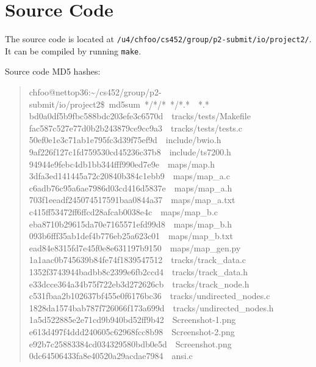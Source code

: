\documentclass[letterpaper]{article}
\begin{document}
\section{Source Code%
  \label{source-code}%
}

The source code is located at \texttt{/u4/chfoo/cs452/group/p2-submit/io/project2/}. It can be compiled by running \texttt{make}.

Source code MD5 hashes:
%
\begin{quote}{\ttfamily \raggedright \noindent
chfoo@nettop36:\textasciitilde{}/cs452/group/p2-submit/io/project2\$~md5sum~*/*/*~*/*.*~~*.*\\
bd0a0df5b9fbc588bdc203efe3c6570d~~tracks/tests/Makefile\\
fac587c527e77d0b2b243879ce9cc9a3~~tracks/tests/tests.c\\
50ef0e1e3c71ab1e795fc3d39f75ef9d~~include/bwio.h\\
9af226f127c1fd759530cd45236c37b8~~include/ts7200.h\\
94944e9febc4db1bb344fff990ed7e9e~~maps/map.h\\
3dfa3ed141445a72c20840b384c1ebb9~~maps/map\_a.c\\
c6adb76c95a6ae7986d03cd416d5837e~~maps/map\_a.h\\
703f1eeadf245074517591baa0844a37~~maps/map\_a.txt\\
c415ff53472ff6ffcd28afcab0038e4c~~maps/map\_b.c\\
eba8710b29615da70e7165571efd99d8~~maps/map\_b.h\\
093b6fff35ab1def4b776eb25a623c01~~maps/map\_b.txt\\
ead84e8315fd7e45f0e8e631197b9150~~maps/map\_gen.py\\
1a1aac0b745639b84fe74f1839547512~~tracks/track\_data.c\\
1352f3743944badbb8c2399e6fb2ccd4~~tracks/track\_data.h\\
e33dcce364a34b75f722eb3d272626cb~~tracks/track\_node.h\\
c531fbaa2b102637bf455e0f6176bc36~~tracks/undirected\_nodes.c\\
1828da1574bab787f726066f173a699d~~tracks/undirected\_nodes.h\\
1a5d522885e2e71cd9b940bd52ff9b42~~Screenshot-1.png\\
e613d497f4ddd240605c62968fcc8b98~~Screenshot-2.png\\
e92b7c25883384cd034329580bdb0e5d~~Screenshot.png\\
0dc64506433fa8e40520a29acdae7984~~ansi.c\\
}
\end{quote}
\end{document}
